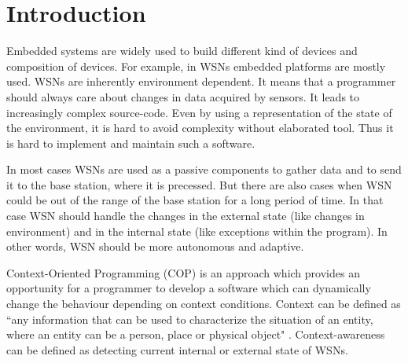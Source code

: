 \documentclass{ubicomp-ext}
\begin{document}
\begin{abstract}

\end{abstract}
\section{Introduction}
Embedded systems are widely used to build different kind of devices and composition of devices. For example, in WSNs embedded platforms are mostly used. WSNs are inherently environment dependent. It  means that a programmer should always care about changes in data acquired by sensors. It leads to increasingly complex source-code. Even by using a representation of the state of the environment, it is hard to avoid complexity without elaborated tool. Thus it is hard to implement and maintain such a software.

In most cases WSNs are used as a passive components to gather data and to send it to the base station, where it is precessed. But there are also cases when WSN could be out of the range of the base station for a long period of time. In that case WSN should handle the changes in the external state (like changes in environment) and in the internal state (like exceptions within the program). In other words, WSN should be more autonomous and adaptive.

Context-Oriented Programming (COP) \cite{hirschfeld08} is an approach which provides an opportunity for a programmer to develop a software which can dynamically change the behaviour depending on context conditions. Context can be defined as ``any information that can be used to characterize the situation of an entity, where an entity can be a person, place or physical object" \cite{dey99}. Context-awareness can be defined as detecting current internal or external state of WSNs.
\end{document}
